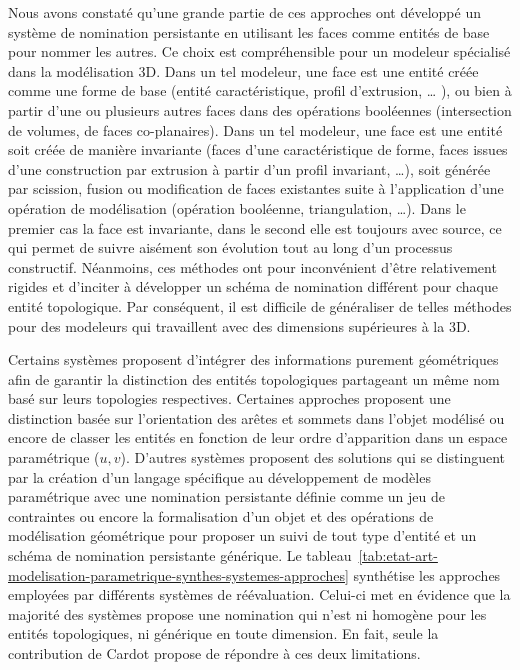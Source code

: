 Nous avons constaté qu'une grande partie de ces approches ont développé un système
de nomination persistante en utilisant les faces comme entités de base pour
nommer les autres. %
Ce choix est compréhensible pour un modeleur spécialisé dans
la modélisation 3D. %
Dans un tel modeleur, une face est une entité créée comme une forme de base
(entité caractéristique, profil d'extrusion, … ), ou bien
à partir d'une ou plusieurs autres faces dans des opérations
booléennes (intersection de volumes, de faces co-planaires).
Dans un tel modeleur, une face est une entité soit créée de manière invariante (faces d'une caractéristique de forme, faces issues d'une construction par extrusion à partir d'un profil invariant, …), soit générée par scission, fusion ou modification de faces existantes suite à l'application d'une opération de modélisation (opération booléenne, triangulation, …). Dans le premier cas la face est invariante, dans le second elle est toujours avec source, ce qui permet de
suivre aisément son évolution tout au long d'un processus constructif. %
Néanmoins, ces méthodes ont pour inconvénient d'être relativement rigides et d'inciter à
développer un schéma de nomination différent pour chaque entité topologique. %
Par conséquent, il est difficile de généraliser de telles méthodes pour
des modeleurs qui travaillent avec des dimensions supérieures à la 3D. %

Certains systèmes proposent d'intégrer des informations purement géométriques
afin de garantir la distinction des entités topologiques partageant un même nom
basé sur leurs topologies respectives. %
Certaines approches proposent une distinction basée sur l'orientation des arêtes
et sommets dans l'objet modélisé ou encore de classer les entités en fonction de
leur ordre d'apparition dans un espace paramétrique (\(u,v\)). %
D'autres systèmes proposent des solutions qui se distinguent par la création d'un langage spécifique au développement de modèles
paramétrique avec une nomination persistante définie comme un jeu de contraintes
ou encore la formalisation d'un objet et des opérations de modélisation
géométrique pour proposer un suivi de tout type d'entité et un schéma de
nomination persistante générique. %
Le tableau~\ref{tab:etat-art-modelisation-parametrique-synthes-systemes-approches} synthétise les approches employées par différents systèmes de réévaluation. %
Celui-ci met en évidence que la majorité des systèmes propose une nomination qui n'est ni homogène pour les entités topologiques, ni générique en toute dimension. %
En fait, seule la contribution de Cardot propose de répondre à ces deux limitations. %


